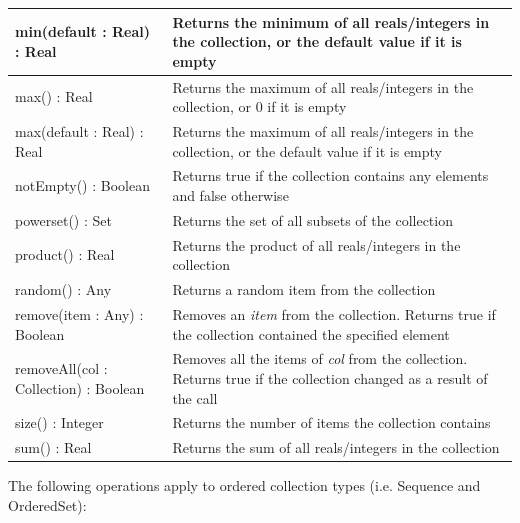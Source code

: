 \begin{longtabu} {|p{6.5cm}|X|}
    min(default : Real) : Real & Returns the minimum of all reals/integers in the collection, or the default value if it is empty \\\hline

    max() : Real & Returns the maximum of all reals/integers in the collection, or 0 if it is empty \\\hline

    max(default : Real) : Real & Returns the maximum of all reals/integers in the collection, or the default value if it is empty \\\hline

    notEmpty() : Boolean & Returns true if the collection contains any elements and false otherwise \\\hline

    powerset() : Set & Returns the set of all subsets of the collection \\\hline

    product() : Real & Returns the product of all reals/integers in the collection\\\hline
    
    random() : Any & Returns a random item from the collection \\\hline
    
    remove(item : Any) : Boolean & Removes an \emph{item} from the collection. Returns true if the collection contained the specified element\\\hline
    
    removeAll(col : Collection) : Boolean & Removes all the items of \emph{col} from the collection. Returns
    true if the collection changed as a result of the call \\\hline
    
    size() : Integer & Returns the number of items the collection contains \\\hline
    
    sum() : Real & Returns the sum of all reals/integers in the collection\\\hline
\end{longtabu}

The following operations apply to ordered collection types (i.e. Sequence and OrderedSet):


